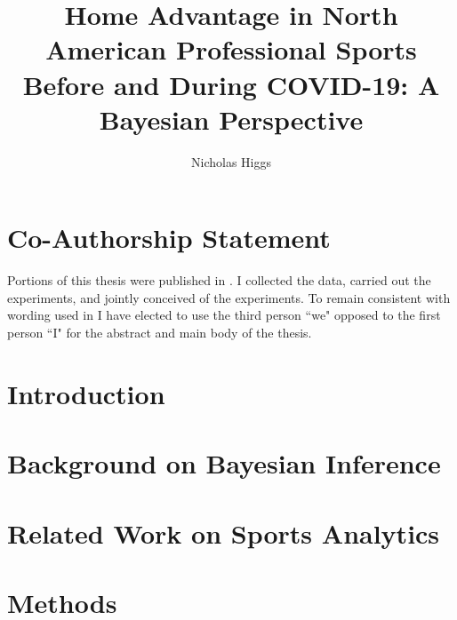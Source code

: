 \documentclass{uofsthesis-cs}
\title{Home Advantage in North American Professional Sports Before and During COVID-19: A Bayesian Perspective}
\author{Nicholas Higgs}
\begin{document}
\maketitle
{}

\frontmatter

\chapter{Co-Authorship Statement}
Portions of this thesis were published in \cite{Higgs2021}. I collected the data, carried out the experiments, and jointly conceived of the experiments. To remain consistent with wording used in \cite{Higgs2021} I have elected to use the third person ``we" opposed to the first person ``I" for the abstract and main body of the thesis.

\chapter{Introduction}



%
% 
% 
%


\chapter{Background on Bayesian Inference}


\chapter{Related Work on Sports Analytics}


\chapter{Methods}

\end{document}
